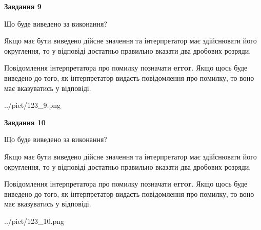 \documentclass[12pt, ukrainian]{article}
\begin{document}
{\begin {Large}
{\begin {center}\textbf{Завдання 9}\end {center}}\par
Що буде виведено за виконання? \par

Якщо має бути виведено дійсне значення та інтерпретатор має здійснювати його округлення, 
то у відповіді достатньо правильно вказати два дробових розряди.

Повідомлення інтерпретатора про помилку позначати \textbf{error}.
Якщо щось буде виведено до того, як інтерпретатор видасть повідомлення про помилку, 
то воно має вказуватись у відповіді. \par

\begin{center}
	{../pict/123_9.png}
\end{center}
\newpage

{\begin {center}\textbf{Завдання 10}\end {center}}\par
Що буде виведено за виконання? \par

Якщо має бути виведено дійсне значення та інтерпретатор має здійснювати його округлення, 
то у відповіді достатньо правильно вказати два дробових розряди.

Повідомлення інтерпретатора про помилку позначати \textbf{error}.
Якщо щось буде виведено до того, як інтерпретатор видасть повідомлення про помилку, 
то воно має вказуватись у відповіді. \par

\begin{center}
	{../pict/123_10.png}
\end{center}
\newpage

\end {Large}}
\end{document}
